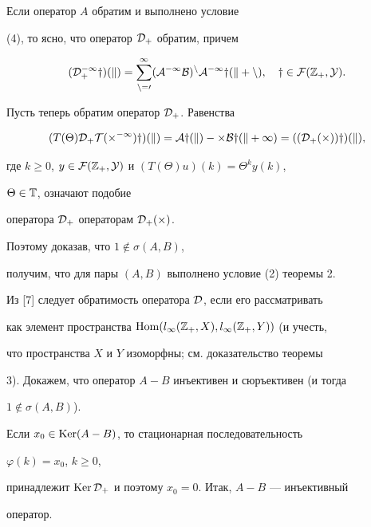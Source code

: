 


\begin{pf} 


Если оператор $A$ обратим и выполнено условие 


(4), то ясно, что оператор $\cal D_+$ обратим, причем 


$$ 


(\cal D^{-1}_+y)(k)=\sum^\infty_{n=0} 


(A^{-1}B)^n A^{-1}y(k+n),\quad y\in\cal F(\Bbb Z_+,Y). 


$$ 


 


Пусть теперь обратим оператор $\cal D_+$. Равенства 


$$ 


(T(\Theta)\cal D_+T(\Theta^{-1})y)(k)=A y(k)-\Theta B y 


(k+1)=((\cal D_+(\Theta))y)(k), 


$$ 


где $k\ge0$, $y\in\cal F(\Bbb Z_+,Y)$ и $(T(\Theta)u)(k)=\Theta^k y(k)$, 


$\Theta\in\Bbb T$, означают подобие 


оператора $\cal D_+$ операторам $\cal D_+(\Theta)$.


Поэтому доказав, что $1\notin\sigma(A,B)$, 


получим, что для пары $(A,B)$ выполнено условие (2) теоремы 2. 


 


Из [7] следует обратимость оператора $\cal D$, если его рассматривать 


как элемент пространства $\Hom(l_\infty(\Bbb Z_+,X),l_\infty(\Bbb 


Z_+,Y))$ (и учесть, 


что пространства $X$ и $Y$ изоморфны; см. доказательство теоремы 


3). Докажем, что оператор $A-B$ инъективен и сюръективен (и тогда 


$1\notin\sigma(A,B)$). 


 


Если $x_0\in\operatorname{Ker}(A-B)$, то стационарная последовательность 


$\varphi(k)=x_0$, $k\ge0$, 


принадлежит $\operatorname{Ker}\cal D_+$ и поэтому $x_0=0$. Итак, $A-B$ --- инъективный 


оператор. 



\end{pf}
